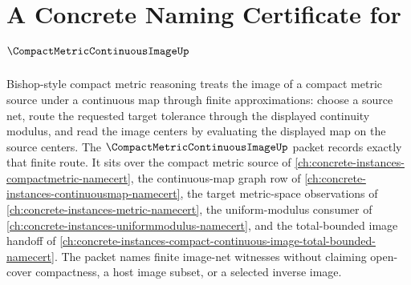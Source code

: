 \chapter{A Concrete Naming Certificate for $\CompactMetricContinuousImageUp$}
\label{ch:concrete-instances-compact-metric-continuous-image-namecert}

Bishop-style compact metric reasoning treats the image of a compact metric source under a continuous map through finite approximations: choose a source net, route the requested target tolerance through the displayed continuity modulus, and read the image centers by evaluating the displayed map on the source centers. The $\CompactMetricContinuousImageUp$ packet records exactly that finite route. It sits over the compact metric source of \autoref{ch:concrete-instances-compactmetric-namecert}, the continuous-map graph row of \autoref{ch:concrete-instances-continuousmap-namecert}, the target metric-space observations of \autoref{ch:concrete-instances-metric-namecert}, the uniform-modulus consumer of \autoref{ch:concrete-instances-uniformmodulus-namecert}, and the total-bounded image handoff of \autoref{ch:concrete-instances-compact-continuous-image-total-bounded-namecert}. The packet names finite image-net witnesses without claiming open-cover compactness, a host image subset, or a selected inverse image.

